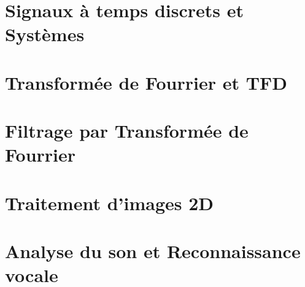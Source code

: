 



\chapter{Signaux à temps discrets et Systèmes}


\chapter{Transformée de Fourrier et TFD}


\chapter{Filtrage par Transformée de Fourrier}


\chapter{Traitement d'images 2D}


\chapter{Analyse du son et Reconnaissance vocale}

